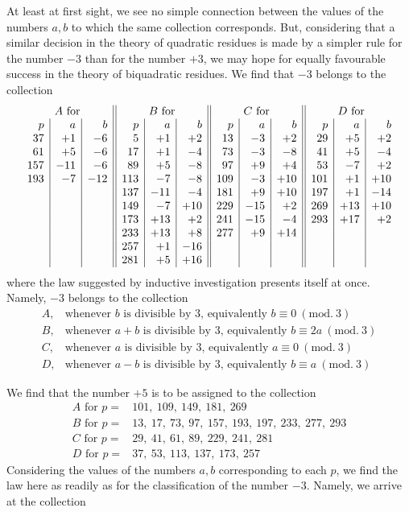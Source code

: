 %
At least at first sight, we see no simple connection between the values of the numbers $a,b$ to which the same collection corresponds. But, considering that a similar decision in the theory of quadratic residues is made by a simpler rule for the number $-3$ than for the number $+3$, we may hope for equally favourable success in the theory of biquadratic residues. We find that $-3$ belongs to the collection
\[
\begin{array}{r|r|r||r|r|r||r|r|r||r|r|r}
\multicolumn{3}{c||}{A\ \text{for}}&\multicolumn{3}{c||}{B\ \text{for}}&\multicolumn{3}{c||}{C\ \text{for}}&\multicolumn{3}{c}{D\ \text{for}}\\
p&a&b&p&a&b&p&a&b&p&a&b\\
37&+1&-6&5&+1&+2&13&-3&+2&29&+5&+2\\
61&+5&-6&17&+1&-4&73&-3&-8&41&+5&-4\\
157&-11&-6&89&+5&-8&97&+9&+4&53&-7&+2\\
193&-7&-12&113&-7&-8&109&-3&+10&101&+1&+10\\
&&&137&-11&-4&181&+9&+10&197&+1&-14\\
&&&149&-7&+10&229&-15&+2&269&+13&+10\\
&&&173&+13&+2&241&-15&-4&293&+17&+2\\
&&&233&+13&+8&277&+9&+14&&&\\
&&&257&+1&-16&&&&&&\\
&&&281&+5&+16&&&&&&
\end{array}
\]
where the law suggested by inductive investigation presents itself at once. Namely, $-3$ belongs to the collection
\[
\begin{array}{ll}
A,&\text{whenever }b\text{ is divisible by }3\text{, equivalently }b\equiv0\ (\mathrm{mod.}\ 3)\\
B,&\text{whenever }a+b\text{ is divisible by }3\text{, equivalently }b\equiv2a\ (\mathrm{mod.}\ 3)\\
C,&\text{whenever }a\text{ is divisible by }3\text{, equivalently }a\equiv0\ (\mathrm{mod.}\ 3)\\
D,&\text{whenever }a-b\text{ is divisible by }3\text{, equivalently }b\equiv a\ (\mathrm{mod.}\ 3)
\end{array}
\]

We find that the number $+5$ is to be assigned to the collection
\[
\begin{array}{ll}
A\text{ for }p=&101,\ 109,\ 149,\ 181,\ 269\\
B\text{ for }p=&13,\ 17,\ 73,\ 97,\ 157,\ 193,\ 197,\ 233,\ 277,\ 293\\
C\text{ for }p=&29,\ 41,\ 61,\ 89,\ 229,\ 241,\ 281\\
D\text{ for }p=&37,\ 53,\ 113,\ 137,\ 173,\ 257
\end{array}
\]
Considering the values of the numbers $a,b$ corresponding to each $p$, we find the law here as readily as for the classification of the number $-3$. Namely, we arrive at the collection

